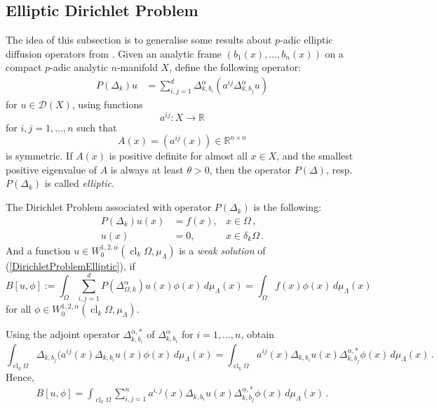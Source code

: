 \documentclass[a4paper,draft]{ZbRad}
\theoremstyle{plain}
\theoremstyle{definition}
\numberwithin{equation}{section}
\DeclareMathOperator{\closure}{cl}
\begin{document}
\subsection{Elliptic Dirichlet Problem}

The idea of this subsection is to generalise some results about $p$-adic elliptic diffusion operators from \cite{ellipticBVP}. Given an analytic frame $(b_1(x),\dots,b_n(x))$ on a compact $p$-adic analytic $n$-manifold $X$, define the following operator:
\begin{align*}
P(\Delta_k)u&=\sum\limits_{i,j=1}^d\Delta_{k,b_i}^\alpha(a^{ij}\Delta_{k,b_j}^\alpha u)
\end{align*}
for $u\in\mathcal{D}(X)$, using functions
\[
a^{ij}\colon X\to\mathbb{R}
\]
for $i,j=1,\dots,n$
such that 
\[
A(x)=(a^{ij}(x))\in\mathbb{R}^{n\times n}
\]
is symmetric. If $A(x)$ is positive definite for almost all $x \in X$, and the smallest positive eigenvalue of $A$ is always at least $\theta > 0$, then the operator $P(\Delta)$, resp.\ $P(\Delta_k)$ is called \emph{elliptic}.
\newline

The Dirichlet Problem associated with operator $P(\Delta_k)$ is the following:
\begin{align}\label{DirichletProblemElliptic}
P(\Delta_k)u(x)&=f(x),&x\in \Omega\,,
\\\nonumber
u(x)&=0,&x\in\delta_k\Omega\,.
\end{align}
And a function $u\in W_0^{1,2,\alpha}(\closure_k\Omega,\mu_\Lambda)$ is a
\emph{weak solution} of (\ref{DirichletProblemElliptic}), if
\[
B[u,\phi]
:=\int_\Omega\sum\limits_{i,j=1}^d P(\Delta_{\Omega,k}^\alpha)u(x)\phi(x)\,d\mu_\Lambda(x)
=\int_\Omega f(x)\phi(x)\,d\mu_\Lambda(x)
\]
for all $\phi\in W_0^{1,2,\alpha}(\closure_k\Omega,\mu_\Lambda)$.
\newline

Using the adjoint operator $\Delta_{k,b_i}^{\alpha,*}$ of $\Delta^\alpha_{k,b_i}$ for $i=1,\dots,n$, obtain
\[
\int_{\closure_k\Omega}\Delta_{k,b_j}(a^{ij}(x)\Delta_{k,b_i} u(x)\phi(x)\,d\mu_\Lambda(x)
=\int_{\closure_k\Omega}a^{ij}(x)\Delta_{k,b_i}u(x)\Delta_{k,b_j}^{\alpha,*}\phi(x)\,d\mu_\Lambda(x)\,.
\]
Hence,
\begin{align}\label{ellipticForm}
B[u,\phi]=\int_{\closure_k\Omega}\sum\limits_{i,j=1}^n
a^{i,j}(x)\Delta_{k,b_i}u(x)\Delta_{k,b_j}^{\alpha,*}\phi(x)\,d\mu_\Lambda(x)\,.
\end{align}
\end{document}

